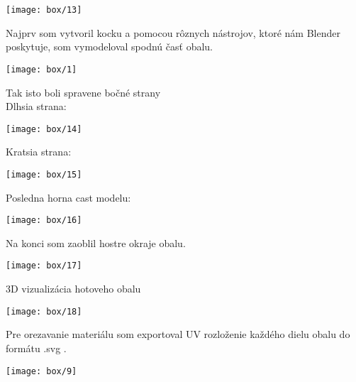         \begin{center}
          \texttt{[image: box/13]}
        \end{center}

        Najprv som vytvoril kocku a pomocou rôznych nástrojov, ktoré nám Blender poskytuje, som vymodeloval spodnú časť obalu. \\

        \begin{center}
          \texttt{[image: box/1]}
        \end{center}

        Tak isto boli spravene bočné strany \\

        Dlhsia strana: \\

        \begin{center}
          \texttt{[image: box/14]} \\
        \end{center}

        Kratsia strana: \\

        \begin{center}
          \texttt{[image: box/15]}
        \end{center}

        Posledna horna cast modelu: \\

        \begin{center}
          \texttt{[image: box/16]}
        \end{center}

        Na konci som zaoblil hostre okraje obalu. \\

        \begin{center}
          \texttt{[image: box/17]}
        \end{center}

        3D vizualizácia hotoveho obalu \\

        \begin{center}
          \texttt{[image: box/18]}
        \end{center}

        Pre orezavanie materiálu som exportoval UV rozloženie každého dielu obalu do formátu .svg .

        \begin{center}
          \texttt{[image: box/9]}
        \end{center}

